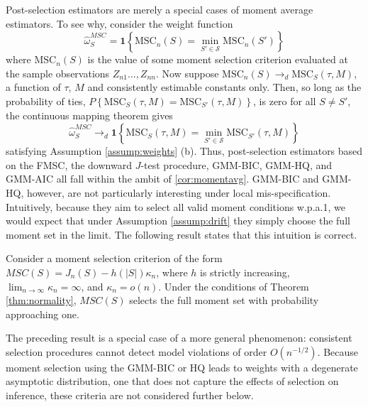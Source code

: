 Post-selection estimators are merely a special cases of moment average estimators.
To see why, consider the weight function
$$\widehat{\omega}_S^{MSC} = \mathbf{1}\left\{\mbox{MSC}_n(S) = \min_{S'\in \mathscr{S}} \mbox{MSC}_n(S')\right\}$$where $\mbox{MSC}_n(S)$ is the value of some moment selection criterion evaluated at the sample observations $Z_{n1}\hdots, Z_{nn}$. 
Now suppose $\mbox{MSC}_n(S) \rightarrow_d\mbox{MSC}_S(\tau,M)$, a function of $\tau$, $M$ and consistently estimable constants only. 
Then, so long as the probability of ties, $P\left\{\mbox{MSC}_S(\tau,M) = \mbox{MSC}_{S'}(\tau,M) \right\}$, is zero for all $S\neq S'$, the continuous mapping theorem gives 
	$$\widehat{\omega}_S^{MSC} \rightarrow_d \mathbf{1}\left\{\mbox{MSC}_S(\tau,M) = \min_{S'\in \mathscr{S}} \mbox{MSC}_{S'}(\tau,M)\right\}$$ 
satisfying Assumption \ref{assump:weights} (b). 
Thus, post-selection estimators based on the FMSC, the downward $J$-test procedure, GMM-BIC, GMM-HQ, and GMM-AIC all fall within the ambit of \ref{cor:momentavg}. 
GMM-BIC and GMM-HQ, however, are not particularly interesting under local mis-specification.
Intuitively, because they aim to select all valid moment conditions w.p.a.1, we would expect that under Assumption \ref{assump:drift} they simply choose the full moment set in the limit. 
The following result states that this intuition is correct. 
\begin{thm}
\label{pro:andrews}
Consider a moment selection criterion of the form $MSC(S) = J_n(S) - h(|S|)\kappa_n$, where $h$ is strictly increasing,  $\lim_{n\rightarrow \infty}\kappa_n = \infty$, and $\kappa_n = o(n)$. Under the conditions of Theorem \ref{thm:normality}, $MSC(S)$ selects the full moment set with probability approaching one.
\end{thm}
The preceding result is a special case of a more general phenomenon: consistent selection procedures cannot detect model violations of order $O(n^{-1/2})$.
Because moment selection using the GMM-BIC or HQ leads to weights with a degenerate asymptotic distribution, one that does not capture the effects of selection on inference, these criteria are not considered further below.
